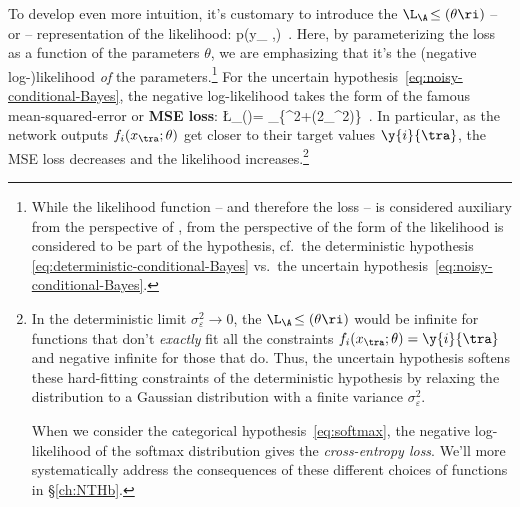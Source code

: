 To develop even more intuition, it's customary to introduce the   $\L_{\A}\!\le(\theta\ri)$
 -- or  -- representation of the likelihood:
 \be
p(y_{\A} \vert \theta,\Hypo)\equiv  \exp\!\le[-\L_{\A}\!\le(\theta\ri)\ri]\, .
\ee
Here, by parameterizing the loss as a function of the parameters $\theta$, we are emphasizing that it's the (negative log-)likelihood \emph{of} the parameters.\footnote{While the likelihood function -- and therefore the loss -- is considered auxiliary from the perspective of , 
from the perspective of  the form of the likelihood is considered to be part of the hypothesis, cf.~the deterministic hypothesis \eqref{eq:deterministic-conditional-Bayes} vs.~the uncertain hypothesis~\eqref{eq:noisy-conditional-Bayes}.
}
For the uncertain hypothesis~\eqref{eq:noisy-conditional-Bayes}, the negative log-likelihood takes the form of the famous mean-squared-error or \textbf{MSE loss}:
\be\label{eq:MSE-loss-preview}
\L_{}(\theta)= \sum_{\tra\in \A}\le\{^2+\log\!\le(2\pi \sigma_{\varepsilon}^2\ri)\ri\}\, .
\ee
In particular, as the network outputs $f_i(x_{\tra}; \theta)$ get closer to their target values $\y{i}{\tra}$,
the MSE loss decreases
and the likelihood increases.\footnote{
In the deterministic limit $\sigma_{\varepsilon}^2\rightarrow 0$, the  $\L_{\A}\!\le(\theta\ri)$ would be infinite for functions that don't \emph{exactly} fit all the constraints $f_i(x_{\tra};\theta)=\y{i}{\tra}$ and negative infinite for those that do.
Thus, the uncertain hypothesis softens these hard-fitting constraints of the deterministic hypothesis by relaxing the  distribution
to a Gaussian distribution with a finite variance $\sigma_{\varepsilon}^2$.

When we consider the categorical hypothesis~\eqref{eq:softmax}, the negative log-likelihood of the softmax distribution gives the \emph{cross-entropy loss}. 
We'll more systematically address the consequences of these different choices of  functions in \S\ref{ch:NTHb}.
} 
